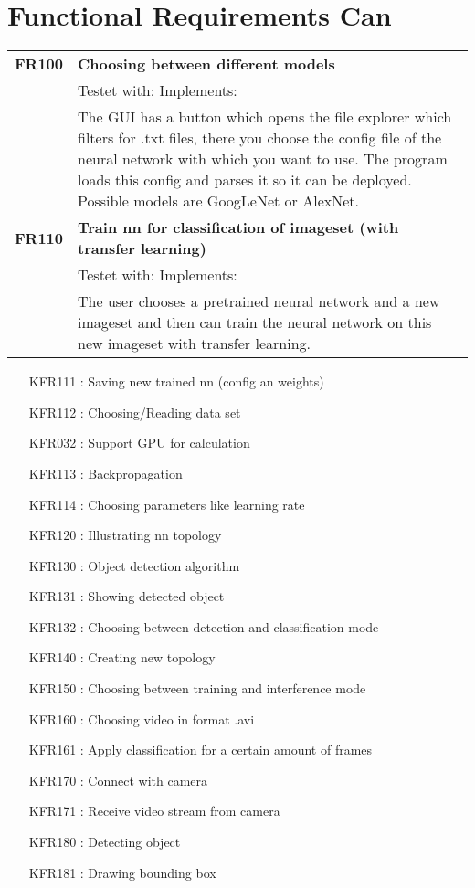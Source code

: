 \documentclass[parskip=full]{scrartcl}
\begin{document}
\section{Functional Requirements Can}
\begin{tabular}{p{2cm}p{12cm}}
\textbf{FR100} & \textbf{Choosing between different models}\\
& Testet with: Implements: \\
& The GUI has a button which opens the file explorer which filters for .txt files, there you choose the config file of the neural network with which you want to use. The program loads this config and parses it so it can be deployed. Possible models are GoogLeNet or AlexNet.\\
\textbf{FR110} & \textbf{Train nn for classification of imageset (with transfer learning)}\\
& Testet with: Implements: \\
& The user chooses a pretrained neural network and a new imageset and then can train the neural network on this new imageset with transfer learning.
\end{tabular}
\begin{itemize}[nosep]
\item [KFR111]: Saving new trained nn (config an weights)
\item [KFR112]: Choosing/Reading data set
\item [KFR032]: Support GPU for calculation
\item [KFR113]: Backpropagation
\item [KFR114]: Choosing parameters like learning rate
\item [KFR120]: Illustrating nn topology
\item [KFR130]: Object detection algorithm
\item [KFR131]: Showing detected object
\item [KFR132]: Choosing between detection and classification mode
\item [KFR140]: Creating new topology
\item [KFR150]: Choosing between training and interference mode
\item [KFR160]: Choosing video in format .avi
\item [KFR161]: Apply classification for a certain amount of frames
\item [KFR170]: Connect with camera 
\item [KFR171]: Receive video stream from camera
\item [KFR180]: Detecting object
\item [KFR181]: Drawing bounding box 

\end{itemize}
\end{document}
